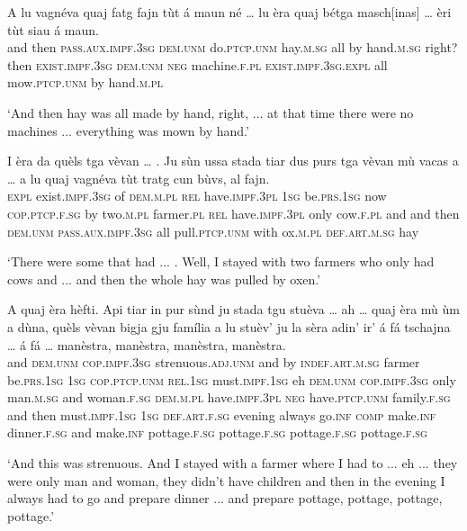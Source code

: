 \begin{linenumbers}
	\gll A lu vagnéva quaj fatg fajn tùt á maun né … lu èra quaj bétga masch[inas] … èri tùt siau á maun.\\
	and then \textsc{pass.aux.impf.3sg} \textsc{dem.unm} do.\textsc{ptcp.unm} hay.\textsc{m.sg} all by hand.\textsc{m.sg} right? {} then \textsc{exist.impf.3sg} \textsc{dem.unm} \textsc{neg} machine.\textsc{f.pl} {} \textsc{exist.impf.3sg.expl} all mow.\textsc{ptcp.unm} by hand.\textsc{m.pl}\\
\end{linenumbers}
\medskip
\glt `And then hay was all made by hand, right, ... at that time there were no machines ... everything was mown by hand.'
\medskip

\begin{linenumbers}
	\gll  I èra da quèls tga vèvan … . Ju sùn ussa stada tiar dus purs tga vèvan mù vacas a … a lu quaj vagnéva tùt tratg cun bùvs, al fajn.\\
	\textsc{expl} exist.\textsc{impf.3sg} of \textsc{dem.m.pl} \textsc{rel} have.\textsc{impf.3pl} {} {} \textsc{1sg} be.\textsc{prs.1sg} now \textsc{cop.ptcp.f.sg} by two.\textsc{m.pl} farmer.\textsc{pl} \textsc{rel} have.\textsc{impf.3pl} only cow.\textsc{f.pl} and {} and then \textsc{dem.unm} \textsc{pass.aux.impf.3sg} all pull.\textsc{ptcp.unm} with ox.\textsc{m.pl} \textsc{def.art.m.sg} hay\\
\end{linenumbers}
\medskip
\glt `There were some that had ... . Well, I stayed with two farmers who only had cows and ... and then the whole hay was pulled by oxen.'
\medskip

\begin{linenumbers}
	\gll  A quaj èra hèfti. Api tiar in pur sùnd ju stada tgu stuèva …  ah … quaj èra mù ùm a dùna, quèls vèvan bigja gju família a lu stuèv’ ju la sèra adin’ ir' á fá tschajna … á fá … manèstra, manèstra, manèstra, manèstra.\\
	and \textsc{dem.unm} \textsc{cop.impf.3sg} strenuous.\textsc{adj.unm} and by \textsc{indef.art.m.sg} farmer be.\textsc{prs.1sg} \textsc{1sg} \textsc{cop.ptcp.unm} \textsc{rel.1sg} must.\textsc{impf.1sg} {} eh {} \textsc{dem.unm} \textsc{cop.impf.3sg} only man.\textsc{m.sg} and woman.\textsc{f.sg} \textsc{dem.m.pl} have.\textsc{impf.3pl} \textsc{neg} have.\textsc{ptcp.unm} family.\textsc{f.sg} and then must.\textsc{impf.1sg} \textsc{1sg} \textsc{def.art.f.sg} evening always go.\textsc{inf} \textsc{comp} make.\textsc{inf} dinner.\textsc{f.sg} {} and make.\textsc{inf} {}  pottage.\textsc{f.sg} pottage.\textsc{f.sg} pottage.\textsc{f.sg} pottage.\textsc{f.sg}\\
\end{linenumbers}
\medskip
\glt `And this was strenuous. And I stayed with a farmer where I had to ... eh ... they were only man and woman, they didn't have children and then in the evening I always had to go and prepare dinner ... and prepare pottage, pottage, pottage, pottage.'
\medskip


